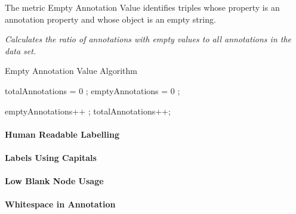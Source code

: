 The metric Empty Annotation Value identifies triples whose property is an annotation property and whose object is an empty string.
 
\begin{mdframed}[style=metricdefinition]
\emph{Calculates the ratio of annotations with empty values to all annotations in the data set.}
\end{mdframed}

\begin{algorithm}
\caption{Empty Annotation Value Algorithm}\label{lst:emptyAnnotationValue}
\begin{algorithmic}[1]
\State totalAnnotations = 0 ;
\State emptyAnnotations = 0 ;
\EndProcedure

 emptyAnnotations++ ; \EndIf
\State totalAnnotations++;
\EndIf
\EndProcedure
\end{algorithmic}
\end{algorithm}


\paragraph{Human Readable Labelling}
\paragraph{Labels Using Capitals}
\paragraph{Low Blank Node Usage}
\paragraph{Whitespace in Annotation}